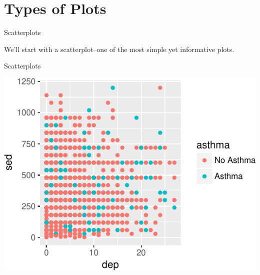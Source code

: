 \section{Types of Plots}\label{types-of-plots}

\begin{frame}[fragile]{Scatterplots}

We'll start with a scatterplot--one of the most simple yet informative
plots.

\begin{Shaded}
\begin{Highlighting}[]
\NormalTok{(}
               \OperatorTok{+}
\StringTok{  }\NormalTok{(}\NormalTok{(}
\end{Highlighting}
\end{Shaded}

\end{frame}

\begin{frame}{Scatterplots}

\includegraphics{09_AdvancedPlotting_files/figure-beamer/c2-1.pdf}

\end{frame}


